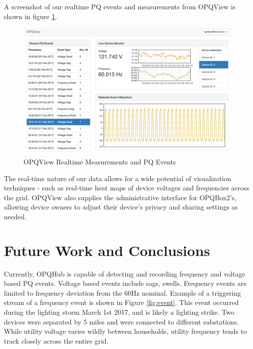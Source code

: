 \documentclass[a4paper, conference]{IEEEtran}
\begin{document}
A screenshot of our realtime PQ events and measurements from OPQView is shown in figure \ref{fig:opqview}.

\begin{figure}
    \includegraphics[width=1.0\linewidth]{img/opqview}
    \caption[OPQView]{OPQView Realtime Measurements and PQ Events}
    \label{fig:opqview}
\end{figure}

The real-time nature of our data allows for a wide potential of visualization techniques - such as real-time heat maps of device voltages and frequencies across the grid. OPQView also supplies the administrative interface for OPQBox2's, allowing device owners to adjust their device's privacy and sharing settings as needed. 

\section{Future Work and Conclusions}

Currently, OPQHub is capable of detecting and recording frequency and 
voltage based PQ events. Voltage based events include sags, swells.
Frequency events are limited to frequency deviation from the 60Hz nominal. Example of a triggering stream of a frequency event is shown in Figure \ref{fig:event}. This event occurred during the lighting storm March 1st 2017, and is likely a lighting strike. Two devices were separated by 5 miles and were connected to different substations. While utility voltage varies wildly between households, utility frequency tends to track closely across the entire grid. 
\end{document}
